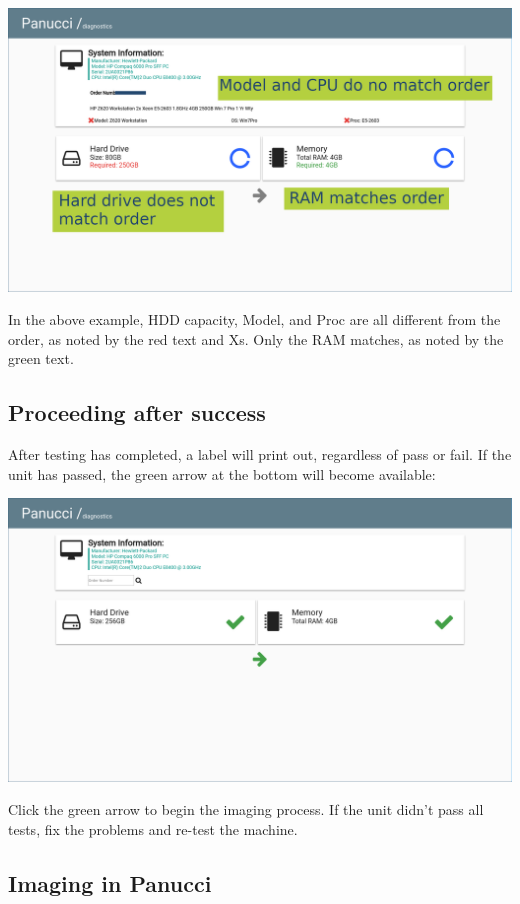 \documentclass{article}
\begin{document}
\begin{flushleft}
\includegraphics[width=\textwidth]{verification_note}

In the above example, HDD capacity, Model, and Proc are all different from the order, as noted by the \textcolor{failurered}{red text and Xs}.  Only the RAM matches, as noted by the \textcolor{successgreen}{green text}.
\subsection{Proceeding after success}
After testing has completed, a label will print out, regardless of pass or fail.  If the unit has passed, the green arrow at the bottom will become available:

\includegraphics[width=\textwidth]{test_good}

Click the green arrow to begin the imaging process.  If the unit didn't pass all tests, fix the problems and re-test the machine.

\subsection{Imaging in Panucci}


\end{flushleft}
\end{document}
